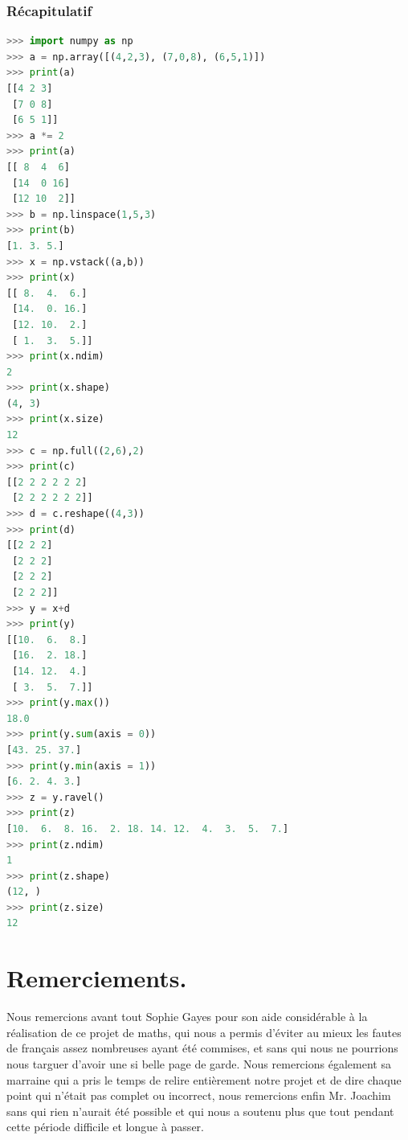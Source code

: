 \documentclass[a4paper, 12pt]{article}
\numberwithin{equation}{subsection}
\begin{document}
\subsubsection{Récapitulatif}
\begin{lstlisting}[language=Python]
>>> import numpy as np
>>> a = np.array([(4,2,3), (7,0,8), (6,5,1)])
>>> print(a)
[[4 2 3]
 [7 0 8]
 [6 5 1]]
>>> a *= 2
>>> print(a)
[[ 8  4  6]
 [14  0 16]
 [12 10  2]]
>>> b = np.linspace(1,5,3)
>>> print(b)
[1. 3. 5.]
>>> x = np.vstack((a,b))
>>> print(x)
[[ 8.  4.  6.]
 [14.  0. 16.]
 [12. 10.  2.]
 [ 1.  3.  5.]]
>>> print(x.ndim)
2
>>> print(x.shape)
(4, 3)
>>> print(x.size)
12
>>> c = np.full((2,6),2)
>>> print(c)
[[2 2 2 2 2 2]
 [2 2 2 2 2 2]]
>>> d = c.reshape((4,3))
>>> print(d)
[[2 2 2]
 [2 2 2]
 [2 2 2]
 [2 2 2]]
>>> y = x+d
>>> print(y)
[[10.  6.  8.]
 [16.  2. 18.]
 [14. 12.  4.]
 [ 3.  5.  7.]]
>>> print(y.max())
18.0
>>> print(y.sum(axis = 0))
[43. 25. 37.]
>>> print(y.min(axis = 1))
[6. 2. 4. 3.]
>>> z = y.ravel()
>>> print(z)
[10.  6.  8. 16.  2. 18. 14. 12.  4.  3.  5.  7.]
>>> print(z.ndim)
1
>>> print(z.shape)
(12, )
>>> print(z.size)
12
\end{lstlisting}
\newpage
\section{Remerciements.}

Nous remercions avant tout Sophie Gayes pour son aide considérable à la réalisation de ce projet de maths, qui nous a permis d'éviter au mieux les fautes de français assez nombreuses ayant été commises, et sans qui nous ne pourrions nous targuer d'avoir une si belle page de garde. Nous remercions également sa marraine qui a pris le temps de relire entièrement notre projet et de dire chaque point qui n'était pas complet ou incorrect, nous remercions enfin Mr. Joachim sans qui rien n'aurait été possible et qui nous a soutenu plus que tout pendant cette période difficile et longue à passer.
\end{document}
